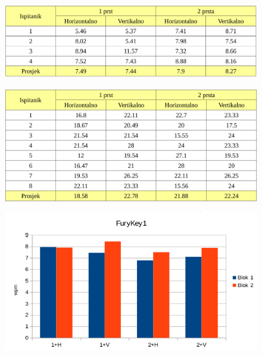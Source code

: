 \documentclass[times, utf8, zavrsni, numeric]{fer}
\begin{document}
\begin{appendices}
\begin{figure}[htb]
\centering
\includegraphics[width=12cm]{img/furykey2_prosjek.png}
\label{tab:furykey2_avg}
\end{figure}

\begin{figure}[htb]
\centering
\includegraphics[width=12cm]{img/qwertz_sve.png}
\label{tab:qwertz_sve}
\end{figure}

\begin{figure}[htb]
\centering
\includegraphics[width=12cm]{img/furykey1_sve_graf.png}
\label{chart:furykey1_sve_graf}
\end{figure}


\end{appendices}
\end{document}
